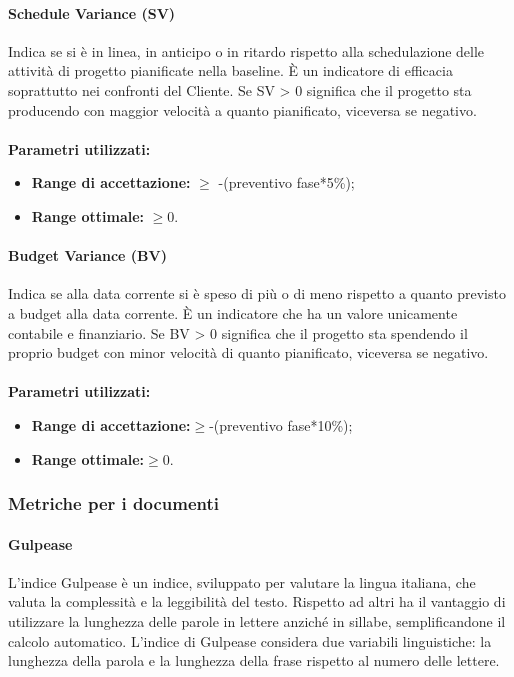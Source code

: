 \documentclass[12pt,a4paper,titlepage]{article}
\begin{document}
			\paragraph{Schedule Variance (SV)}
			Indica se si è in linea, in anticipo o in ritardo rispetto alla schedulazione delle attività di progetto pianificate nella baseline. È un indicatore di efficacia soprattutto nei confronti del Cliente. Se SV > 0 significa che il progetto sta producendo con maggior velocità a quanto pianificato, viceversa se negativo.
			\\ \\
			\textbf{Parametri utilizzati:}
			\begin{itemize}
				\item \textbf{Range di accettazione:} $\geq$ -(preventivo fase*5\%);
				\item \textbf{Range ottimale:} $\geq0$.
			\end{itemize}
			\paragraph{Budget Variance (BV)}
			Indica se alla data corrente si è speso di più o di meno rispetto a quanto previsto a budget alla data corrente. È un indicatore che ha un valore unicamente contabile e finanziario. Se BV > 0 significa che il progetto sta spendendo il proprio budget con minor velocità di quanto pianificato, viceversa se negativo. 
			\\ \\
			\textbf{Parametri utilizzati:}
			\begin{itemize}
				\item \textbf{Range di accettazione:}$\geq$-(preventivo fase*10\%);
				\item \textbf{Range ottimale:}$\geq0$.
			\end{itemize}
		\subsubsection{Metriche per i documenti}
			\paragraph{Gulpease}
			L'indice Gulpease è un indice, sviluppato per valutare la lingua italiana, che valuta la complessità e la leggibilità del testo. Rispetto ad altri ha il vantaggio di utilizzare la lunghezza delle parole in lettere anziché in sillabe, semplificandone il calcolo automatico. L'indice di Gulpease considera due variabili linguistiche: la lunghezza della parola e la lunghezza della frase rispetto al numero delle lettere.
			
\end{document}

